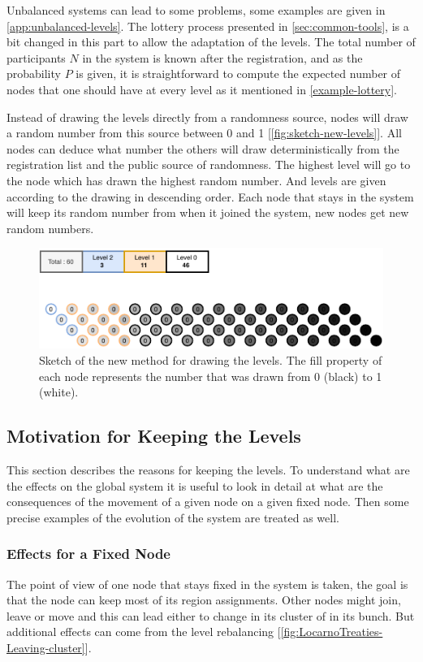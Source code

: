 \documentclass[a4paper,11pt,oneside]{report}
\begin{document}
Unbalanced systems can lead to some problems, some examples are given in
\autoref{app:unbalanced-levels}. The lottery process presented in
\autoref{sec:common-tools}, is a bit changed in this part to allow the
adaptation of the levels. The total number of participants $N$ in the system is
known after the registration, and as the probability $P$ is given, it is
straightforward to compute the expected number of nodes that one should have at
every level as it mentioned in \autoref{example-lottery}. 

Instead of drawing the levels directly from a randomness source, nodes will
draw a random number from this source between 0 and 1
[\autoref{fig:sketch-new-levels}]. All nodes can deduce what number the others
will draw deterministically from the registration list and the public source of
randomness. The highest level will go to the node which has drawn the highest
random number. And levels are given according to the drawing in descending
order. Each node that stays in the system will keep its random number from when
it joined the system, new nodes get new random numbers. 

\begin{figure}[!h] 
\centering
\includegraphics[width=400pt]{figures/Lottery-Locarno}
\caption{Sketch of the new method for drawing the levels. The fill property of each node represents
  the number that was drawn from 0 (black) to 1 (white).}
  \label{fig:sketch-new-levels}
\end{figure}


\subsection{Motivation for Keeping the Levels} This section describes the
reasons for keeping the levels. To understand what are the effects on the
global system it is useful to look in detail at what are the consequences of
the movement of a given node on a given fixed node. Then some precise examples
of the evolution of the system are treated as well. 

\subsubsection{Effects for a Fixed Node} The point of view of one node that
stays fixed in the system is taken, the goal is that the node can keep most of
its region assignments. Other nodes might join, leave or move and this can lead
either to change in its cluster of in its bunch. But additional effects can
come from the level rebalancing
[\autoref{fig:LocarnoTreaties-Leaving-cluster}]. 
\end{document}
